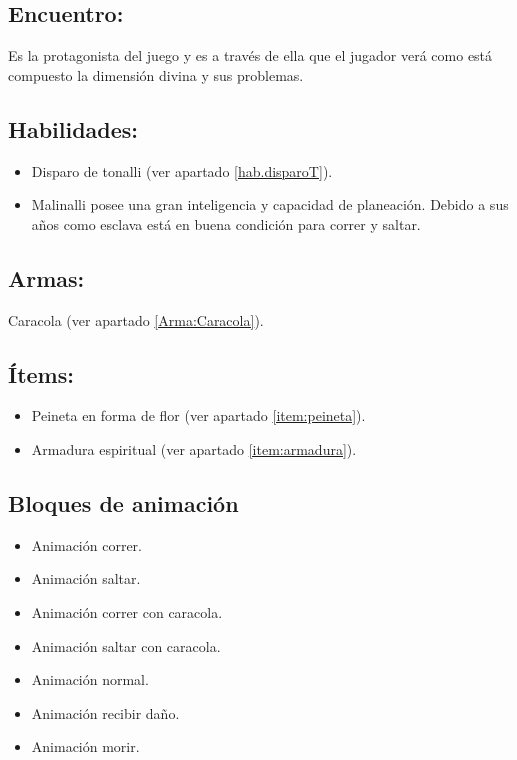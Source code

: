 \subsection{Encuentro:}
Es la protagonista del juego y es a través de ella que el jugador verá como está compuesto la dimensión divina y sus problemas. 

\subsection{Habilidades:}
\begin{itemize}
	\item Disparo de tonalli (ver apartado \ref{hab.disparoT}).
	\item Malinalli posee una gran inteligencia y capacidad de planeación. Debido a sus años como esclava está en buena condición para correr y saltar.
\end{itemize} 
\subsection{Armas:}
Caracola (ver apartado \ref{Arma:Caracola}).
\subsection{Ítems:}
\begin{itemize}
	\item Peineta en forma de flor (ver apartado \ref{item:peineta}).
	\item Armadura espiritual (ver apartado \ref{item:armadura}).
\end{itemize}

\subsection{Bloques de animación}
\begin{itemize}
		\item Animación correr.
		\item Animación saltar.
		\item Animación correr con caracola.
		\item Animación saltar con caracola.
		\item Animación normal.
		\item Animación recibir daño.
		\item Animación morir. 
\end{itemize}